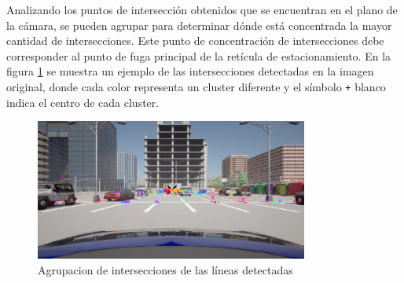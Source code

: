 Analizando los puntos de intersección obtenidos que se encuentran en el plano de la cámara, se pueden agrupar para determinar dónde está
concentrada la mayor cantidad de intersecciones.
Este punto de concentración de intersecciones debe corresponder al punto de fuga principal de la retícula de estacionamiento.
En la figura \ref{fig:intersections} se muestra un ejemplo de las intersecciones detectadas en la imagen original,
donde cada color representa un cluster diferente y el símbolo \texttt{+} blanco indica el centro de cada cluster.
\\

\begin{figure}[!ht]
    \centering
    \includegraphics[width=0.8\textwidth]{img/reticule/svd-km}
    \caption{Agrupacion de intersecciones de las líneas detectadas}
    \label{fig:intersections}
\end{figure}


